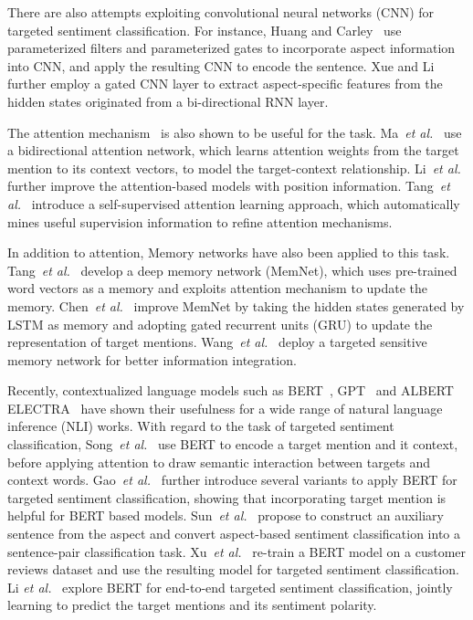 \documentclass[journal]{IEEEtran}
\begin{document}
	There are also attempts exploiting convolutional neural networks (CNN) for targeted sentiment classification. 
	For instance, 
	Huang and Carley~\cite{huang-carley-2018-parameterized} use parameterized filters and parameterized gates to incorporate aspect information into CNN, and apply the resulting CNN to encode the sentence.
	Xue and Li~\cite{xue-li-2018-aspect} further employ a gated CNN layer to extract aspect-specific features from the hidden states originated from a bi-directional RNN layer.
	
	The attention mechanism~\cite{Bahdanau2015NeuralMT,Vaswani2017AttentionIA} is also shown to be useful for the task.
	Ma~\textit{et al.}~\cite{Ma2017InteractiveAN} use a bidirectional attention network, which learns attention weights from the target mention to its context vectors, to model the target-context relationship. 
	Li~\textit{et al.}~\cite{li-etal-2018-hierarchical} further improve the attention-based models with position information.
	Tang~\textit{et al.}~\cite{tang-etal-2019-progressive} introduce a self-supervised attention learning approach, which automatically mines useful supervision information to refine attention mechanisms.
	
	In addition to attention, Memory networks have also been applied to this task. 
	Tang~\textit{et al.}~\cite{Tang2016AspectLS} develop a deep memory network (MemNet), which uses pre-trained word vectors as a memory and exploits attention mechanism to update the memory.
	Chen~\textit{et al.}~\cite{Chen2017RecurrentAN} improve MemNet by taking the hidden states generated by LSTM as memory and adopting gated recurrent units (GRU) to update the representation of target mentions.
	Wang~\textit{et al.}~\cite{Wang2018TargetSensitiveMN} deploy a targeted sensitive memory network for better information integration.
	
	Recently, contextualized language models such as BERT~\cite{devlin-etal-2019-bert}, GPT~\cite{Radford2018ImprovingLU} and ALBERT~\cite{Lan2020ALBERTAL} ELECTRA~\cite{Clark2020ELECTRA} have shown their usefulness for a wide range of natural language inference (NLI) works.
	With regard to the task of targeted sentiment classification, Song~\textit{et al.}~\cite{Song2019AttentionalEN} use BERT to encode a target mention and  it context, before applying attention to draw semantic interaction between targets and context words.
	Gao~\textit{et al.}~\cite{Gao19bertABSA} further introduce several variants to apply BERT for targeted sentiment classification, showing that incorporating target mention is helpful for BERT based models.
	Sun~\textit{et al.}~\cite{sun-etal-2019-utilizing} propose to construct an auxiliary sentence from the aspect and convert aspect-based sentiment classification into a
	sentence-pair classification task. 
	Xu~\textit{et al.}~\cite{xu-etal-2019-bert} re-train a BERT model on a customer reviews dataset and use the resulting model for targeted sentiment classification.
	Li \textit{et al.}~\cite{li-etal-2019-exploiting} explore BERT for end-to-end targeted sentiment classification, jointly learning to predict the target mentions and its sentiment polarity.
	
\end{document}
